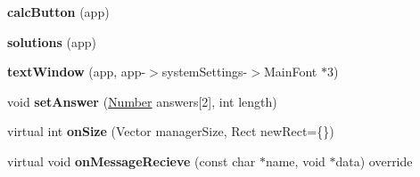 \begin{DoxyCompactItemize}
\item 
\hypertarget{struct_solution_window_ac1f68c80e77a760bde3a453df465ee89}{
{\bfseries calcButton} (app)}
\label{struct_solution_window_ac1f68c80e77a760bde3a453df465ee89}

\item 
\hypertarget{struct_solution_window_a3b5d4cafdf2e22baadcf98458031e361}{
{\bfseries solutions} (app)}
\label{struct_solution_window_a3b5d4cafdf2e22baadcf98458031e361}

\item 
\hypertarget{struct_solution_window_a49bd318a52dba8176399a31b12abdade}{
{\bfseries textWindow} (app, app-\/$>$systemSettings-\/$>$MainFont $\ast$3)}
\label{struct_solution_window_a49bd318a52dba8176399a31b12abdade}

\item 
\hypertarget{struct_solution_window_ade5ec3301160d71543861fa5ff304b65}{
void {\bfseries setAnswer} (\hyperlink{struct_number}{Number} answers\mbox{[}2\mbox{]}, int length)}
\label{struct_solution_window_ade5ec3301160d71543861fa5ff304b65}

\item 
\hypertarget{struct_solution_window_a1c03a2ee74011c0a074af627afb8ed2f}{
virtual int {\bfseries onSize} (Vector managerSize, Rect newRect=\{\})}
\label{struct_solution_window_a1c03a2ee74011c0a074af627afb8ed2f}

\item 
\hypertarget{struct_solution_window_a2d8d20928bef617e08770ec8d021fdcb}{
virtual void {\bfseries onMessageRecieve} (const char $\ast$name, void $\ast$data) override}
\label{struct_solution_window_a2d8d20928bef617e08770ec8d021fdcb}

\end{DoxyCompactItemize}
